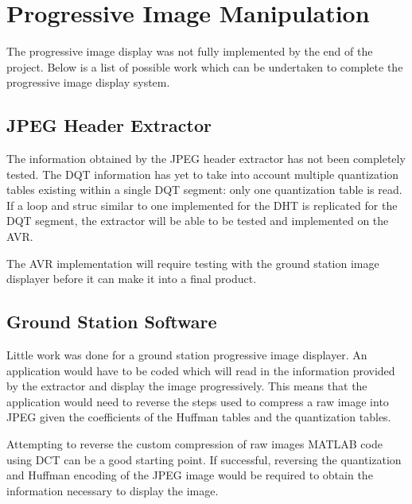 \section{Progressive Image Manipulation}

The progressive image display was not fully implemented
by the end of the project. Below is a list of possible work
which can be undertaken to complete the progressive
image display system.

\subsection{JPEG Header Extractor}

The information obtained by the JPEG header extractor
has not been completely tested. The DQT information 
has yet to take into account multiple quantization tables
existing within a single DQT segment: only one 
quantization table is read. If a loop and struc similar to 
one implemented for the DHT is replicated for the DQT
segment, the extractor will be able to be tested and
implemented on the AVR.

The AVR implementation will require testing with
the ground station image displayer before it
can make it into a final product.

\subsection{Ground Station Software}

Little work was done for a ground station
progressive image displayer. An application would have
to be coded which will read in the information provided by
the extractor and display the image progressively.
This means that the application would need to reverse the
steps used to compress a raw image into JPEG given the 
coefficients of the Huffman tables and the quantization
tables. 

Attempting to reverse the custom compression of 
raw images MATLAB code using DCT can be a good 
starting point. If successful, reversing the quantization 
and Huffman encoding of the JPEG image would be 
required to obtain the information 
necessary to display the image.